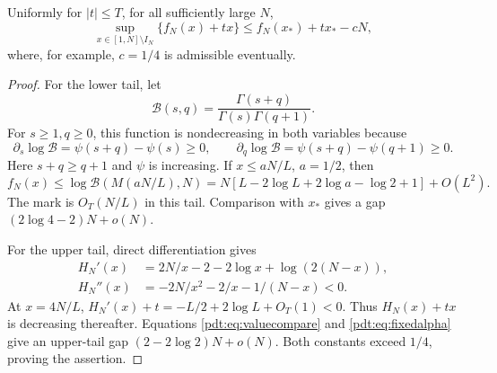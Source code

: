 \begin{lemma}\label{pdt:lem:global}
Uniformly for $|t|\le T$, for all sufficiently large $N$,
\begin{equation}\label{pdt:eq:globalgap}
 \sup_{x\in[1,N]\setminus I_N}\{f_N(x)+tx\}
 \le f_N(x_*)+tx_*-cN,
\end{equation}
where, for example, $c=1/4$ is admissible eventually.
\end{lemma}
\begin{proof}
For the lower tail, let
\[
 \mathcal B(s,q)=\frac{\Gamma(s+q)}{\Gamma(s)\Gamma(q+1)}.
\]
For $s\ge1,q\ge0$, this function is nondecreasing in both variables because
\[
 \partial_s\log\mathcal B=\psi(s+q)-\psi(s)\ge0,\qquad
 \partial_q\log\mathcal B=\psi(s+q)-\psi(q+1)\ge0.
\]
Here $s+q\ge q+1$ and $\psi$ is increasing. If $x\le aN/L$, $a=1/2$, then
\[
 f_N(x)\le\log\mathcal B(M(aN/L),N)
 =N[L-2\log L+2\log a-\log2+1]+O(L^2).
\]
The mark is $O_T(N/L)$ in this tail. Comparison with $x_*$ gives a gap
$(2\log4-2)N+o(N)$.

For the upper tail, direct differentiation gives
\begin{align}
 H_N'(x)&=2N/x-2-2\log x+\log(2(N-x)),\label{pdt:eq:Hprime}\\
 H_N''(x)&=-2N/x^2-2/x-1/(N-x)<0.\label{pdt:eq:Hsecond}
\end{align}
At $x=4N/L$, $H_N'(x)+t=-L/2+2\log L+O_T(1)<0$. Thus $H_N(x)+tx$ is decreasing thereafter. Equations \eqref{pdt:eq:valuecompare} and \eqref{pdt:eq:fixedalpha} give an upper-tail gap $(2-2\log2)N+o(N)$. Both constants exceed $1/4$, proving the assertion.
\end{proof}

